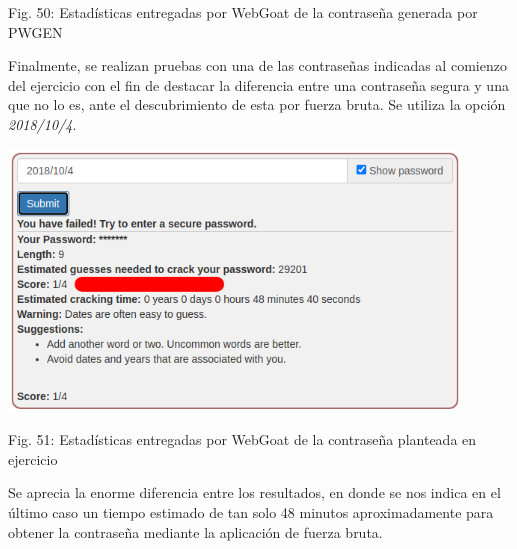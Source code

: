 \documentclass[12pt,oneside,a4paper]{book}
\begin{document}
\begin{enumerate}
\begin{enumerate}
\begin{center}
            \vspace{0.1em}
            
            Fig. 50: Estadísticas entregadas por WebGoat de la contraseña generada por PWGEN
        \end{center}
        
        \vspace{2em}

        \hspace{20pt}
        Finalmente, se realizan pruebas con una de las contraseñas indicadas al comienzo del ejercicio con el fin de destacar la diferencia entre una contraseña segura y una que no lo es, ante el descubrimiento de esta por fuerza bruta. Se utiliza la opción \textit{2018/10/4}.

        \newpage
        
        \begin{center}
            \includegraphics[width=12cm]{img/3.png}
            
            \vspace{0.1em}
            
            Fig. 51: Estadísticas entregadas por WebGoat de la contraseña planteada en ejercicio
        \end{center}
        
        \vspace{2em}

        \hspace{20pt}
        Se aprecia la enorme diferencia entre los resultados, en donde se nos indica en el último caso un tiempo estimado de tan solo 48 minutos aproximadamente para obtener la contraseña mediante la aplicación de fuerza bruta.        
    \end{enumerate}
\end{enumerate}

\vspace{2em}
\end{document}
